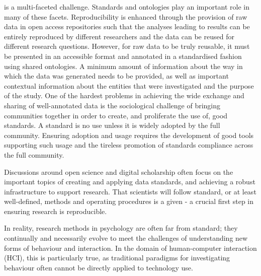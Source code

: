 \documentclass[a4paper,UKenglish]{dagrep}
\begin{document}
{}
\license
 is a multi-faceted challenge. Standards and ontologies play an important role
in many of these facets. Reproducibility is enhanced through the provision of
raw data in open access repositories such that the analyses leading to results
can be entirely reproduced by different researchers and the data can be reused
for different research questions. However, for raw data to be truly reusable, it
must be presented in an accessible format and annotated in a standardised
fashion using shared ontologies. A minimum amount of information about the way
in which the data was generated needs to be provided, as well as important
contextual information about the entities that were investigated and the purpose
of the study. One of the hardest problems in achieving the wide exchange and
sharing of well-annotated data is the sociological challenge of bringing
communities together in order to create, and proliferate the use of, good
standards. A standard is no use unless it is widely adopted by the full
community. Ensuring adoption and usage requires the development of good tools
supporting such usage and the tireless promotion of standards compliance across
the full community. 


{}
\license
{}
Discussions around open science and digital scholarship often focus on the 
important topics of creating and applying data standards, and achieving a robust  
infrastructure to support research. That scientists will follow standard, or at 
least well-defined, methods and operating procedures is a given - a crucial first 
step in ensuring research is reproducible.

In reality, research methods in psychology are often far from standard; they 
continually and necessarily evolve to meet the challenges of understanding 
new forms of behaviour and interaction. In the domain of human-computer 
interaction (HCI), this is particularly true, as traditional paradigms for
investigating behaviour often cannot be directly applied to technology use.
\end{document}
